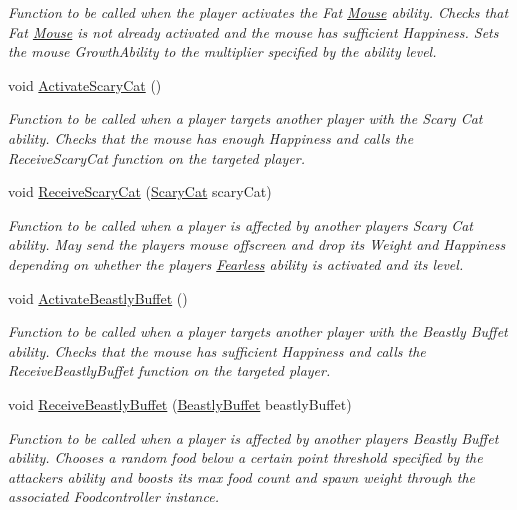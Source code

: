 \begin{DoxyCompactItemize}
\begin{DoxyCompactList}\small\item\em Function to be called when the player activates the Fat \hyperlink{class_mouse}{Mouse} ability. Checks that Fat \hyperlink{class_mouse}{Mouse} is not already activated and the mouse has sufficient Happiness. Sets the mouse Growth\+Ability to the multiplier specified by the ability level. \end{DoxyCompactList}\item 
void \hyperlink{class_ability_controller_a665fadfb91f33423469ef2bbb1c02bbb}{Activate\+Scary\+Cat} ()
\begin{DoxyCompactList}\small\item\em Function to be called when a player targets another player with the Scary Cat ability. Checks that the mouse has enough Happiness and calls the Receive\+Scary\+Cat function on the targeted player. \end{DoxyCompactList}\item 
void \hyperlink{class_ability_controller_a989129033d7fc245de98273cf067bc87}{Receive\+Scary\+Cat} (\hyperlink{class_scary_cat}{Scary\+Cat} scary\+Cat)
\begin{DoxyCompactList}\small\item\em Function to be called when a player is affected by another player\textquotesingle{}s Scary Cat ability. May send the player\textquotesingle{}s mouse offscreen and drop its Weight and Happiness depending on whether the player\textquotesingle{}s \hyperlink{class_fearless}{Fearless} ability is activated and its level. \end{DoxyCompactList}\item 
void \hyperlink{class_ability_controller_a7f2712d50691dc9d63660114aa575dc2}{Activate\+Beastly\+Buffet} ()
\begin{DoxyCompactList}\small\item\em Function to be called when a player targets another player with the Beastly Buffet ability. Checks that the mouse has sufficient Happiness and calls the Receive\+Beastly\+Buffet function on the targeted player. \end{DoxyCompactList}\item 
void \hyperlink{class_ability_controller_a32935e1cf937f688e446f775bf4c6b1e}{Receive\+Beastly\+Buffet} (\hyperlink{class_beastly_buffet}{Beastly\+Buffet} beastly\+Buffet)
\begin{DoxyCompactList}\small\item\em Function to be called when a player is affected by another player\textquotesingle{}s Beastly Buffet ability. Chooses a random food below a certain point threshold specified by the attacker\textquotesingle{}s ability and boosts its max food count and spawn weight through the associated Foodcontroller instance. \end{DoxyCompactList}\item 

\end{DoxyCompactItemize}
